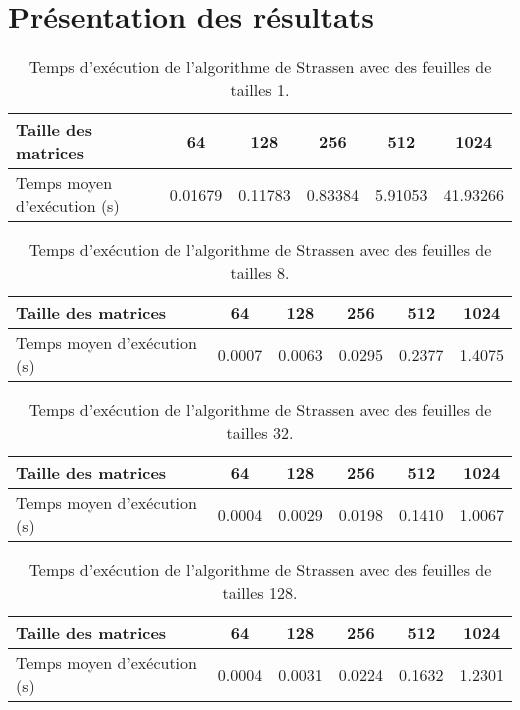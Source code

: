 \documentclass[a4paper, 12pt]{article} %
\begin{document}
\section{Présentation des résultats}
\begin{table}[H]
\caption{Temps d'exécution de l'algorithme de Strassen avec des feuilles de tailles 1.}
\centering
    \begin{tabular}{| l | c | c | c | c | c |}
    \hline
    Taille des matrices & 64 & 128 & 256 & 512 & 1024 \\
    \hline  
    Temps moyen d'exécution (s) & 0.01679 & 0.11783 & 0.83384 & 5.91053 & 41.93266 \\
    \hline  
    \end{tabular}
\end{table}
\begin{table}[H]
    \caption{Temps d'exécution de l'algorithme de Strassen avec des feuilles de tailles 8.}
    \centering
    \begin{tabular}{| l | c | c | c | c | c |}
    \hline    
    Taille des matrices & 64 & 128 & 256 & 512 & 1024 \\
    \hline  
    Temps moyen d'exécution (s) & 0.0007 & 0.0063 & 0.0295 & 0.2377 & 1.4075 \\
    \hline  
    \end{tabular}
\end{table}
\begin{table}[H]
    \caption{Temps d'exécution de l'algorithme de Strassen avec des feuilles de tailles 32.}
    \centering
    \begin{tabular}{| l | c | c | c | c | c |}
    \hline
    Taille des matrices & 64 & 128 & 256 & 512 & 1024 \\
    \hline  
    Temps moyen d'exécution (s) & 0.0004 & 0.0029 & 0.0198 & 0.1410 & 1.0067 \\
    \hline      
    \end{tabular}
\end{table}
\begin{table}[H]
    \caption{Temps d'exécution de l'algorithme de Strassen avec des feuilles de tailles 128.}
    \centering
    \begin{tabular}{| l | c | c | c | c | c |}
    \hline
    Taille des matrices & 64 & 128 & 256 & 512 & 1024 \\
    \hline  
    Temps moyen d'exécution (s) & 0.0004 & 0.0031 & 0.0224 & 0.1632 & 1.2301 \\
    \hline  
    \end{tabular}
\end{table}
\end{document}
